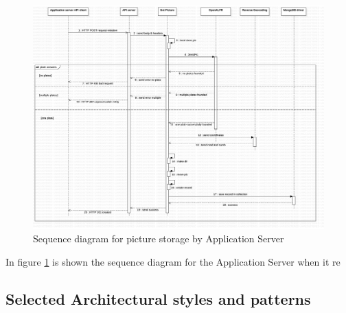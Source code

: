 \begin{figure}[H]
\centering
\includegraphics[width=\textwidth]{Images/DDSequencePic2.png}
\caption{\label{fig:sequencepic2} Sequence diagram for picture storage by Application Server}
\end{figure}
In figure \ref{fig:sequencepic2} is shown the sequence diagram for the Application Server when it re

\subsection{Selected Architectural styles and patterns}
 \label{cleanArchiref}
